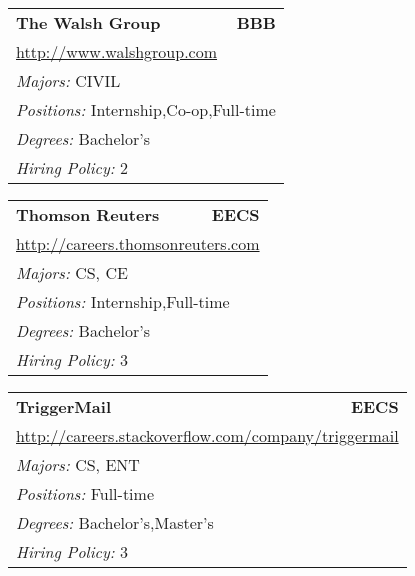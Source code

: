 \documentclass[twoside]{article}
\begin{document}
\begin{center}
\begin{multicols}{3}
\begin{FlushLeft}
\begin{minipage}{.9\columnwidth}
\end{minipage}
 
\begin{minipage}{.9\columnwidth}\begin{tabularx}{.95\columnwidth}{Xr}
                 {\Large\bf The Walsh Group} & {\Large\bf BBB}\\
    \multicolumn{2}{p{.95\columnwidth}}{\url{http://www.walshgroup.com}}\\
    \multicolumn{2}{p{.95\columnwidth}}{\emph{Majors:} CIVIL}\\
    \multicolumn{2}{p{.95\columnwidth}}{\emph{Positions:} Internship,Co-op,Full-time}\\
    \multicolumn{2}{p{.95\columnwidth}}{\emph{Degrees:} Bachelor's}\\
    \multicolumn{2}{p{.95\columnwidth}}{\emph{Hiring Policy:} 2}\\
    \end{tabularx}
    
\end{minipage}
 
\begin{minipage}{.9\columnwidth}\begin{tabularx}{.95\columnwidth}{Xr}
                 {\Large\bf Thomson Reuters} & {\Large\bf EECS}\\
    \multicolumn{2}{p{.95\columnwidth}}{\url{http://careers.thomsonreuters.com}}\\
    \multicolumn{2}{p{.95\columnwidth}}{\emph{Majors:} CS, CE}\\
    \multicolumn{2}{p{.95\columnwidth}}{\emph{Positions:} Internship,Full-time}\\
    \multicolumn{2}{p{.95\columnwidth}}{\emph{Degrees:} Bachelor's}\\
    \multicolumn{2}{p{.95\columnwidth}}{\emph{Hiring Policy:} 3}\\
    \end{tabularx}
    
\end{minipage}
 
\begin{minipage}{.9\columnwidth}\begin{tabularx}{.95\columnwidth}{Xr}
                 {\Large\bf TriggerMail} & {\Large\bf EECS}\\
    \multicolumn{2}{p{.95\columnwidth}}{\url{http://careers.stackoverflow.com/company/triggermail}}\\
    \multicolumn{2}{p{.95\columnwidth}}{\emph{Majors:} CS, ENT}\\
    \multicolumn{2}{p{.95\columnwidth}}{\emph{Positions:} Full-time}\\
    \multicolumn{2}{p{.95\columnwidth}}{\emph{Degrees:} Bachelor's,Master's}\\
    \multicolumn{2}{p{.95\columnwidth}}{\emph{Hiring Policy:} 3}\\
    \end{tabularx}
    

\end{minipage}
\end{FlushLeft}
\end{multicols}
\end{center}
\end{document}
